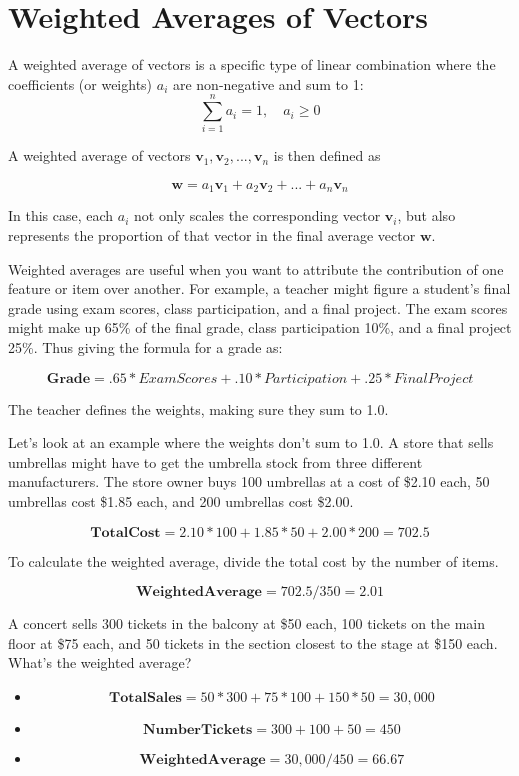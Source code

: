 \section{Weighted Averages of Vectors}
A weighted average of vectors is a specific type of linear combination
where the coefficients (or weights) $a_i$ are non-negative and sum to
1:
\[
\sum_{i=1}^{n} a_i = 1, \quad a_i \geq 0
\]

A weighted average of vectors $\mathbf{v}_1, \mathbf{v}_2, ...,
\mathbf{v}_n$ is then defined as

\[
\mathbf{w} = a_1\mathbf{v}_1 + a_2\mathbf{v}_2 + ... + a_n\mathbf{v}_n
\]

In this case, each $a_i$ not only scales the corresponding vector
$\mathbf{v}_i$, but also represents the proportion of that vector in
the final average vector $\mathbf{w}$.

Weighted averages are useful when you want to attribute the contribution of one feature or item over another. For example, a teacher might figure a student's final grade using exam scores, class participation, and a final project. The exam scores might make up 65\% of the final grade, class participation 10\%, and a final project 25\%. Thus giving the formula for a grade as:

\[
\mathbf{Grade} = .65*ExamScores + .10*Participation + .25*FinalProject
\]

The teacher defines the weights, making sure they sum to 1.0. 

Let's look at an example where the weights don't sum to 1.0. A store that sells umbrellas might have to get the umbrella stock from three different manufacturers. The store owner buys 100 umbrellas at a cost of \$2.10 each, 50 umbrellas cost \$1.85 each, and 200 umbrellas cost \$2.00. 

\[
\mathbf{TotalCost} = 2.10*100 + 1.85*50 + 2.00*200 = 702.5
\]

To calculate the weighted average, divide the total cost by the number of items.

\[
\mathbf{WeightedAverage} = 702.5/350 = 2.01 
\]

\begin{Exercise}[title={Weighted Average}, label=weightedAverage]
A concert sells 300 tickets in the balcony at \$50 each, 100 tickets on the main floor at \$75 each, and 50 tickets in the section closest to the stage at \$150 each. What's the weighted average?
\end{Exercise}
\begin{Answer}[ref=weightedAverage]
 	\begin{itemize}
    	\item\[\mathbf{TotalSales} = 50*300 + 75*100 + 150*50 = 30,000\]
		\item\[\mathbf{NumberTickets} = 300 + 100 + 50 = 450\]
		\item\[\mathbf{WeightedAverage} = 30,000/450 = 66.67\]
 	\end{itemize} 
\end{Answer}

